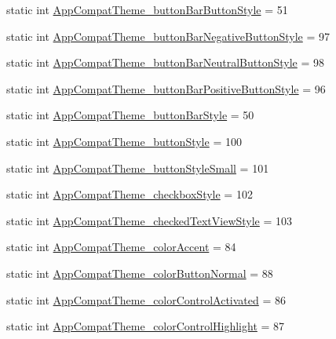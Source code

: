 \begin{DoxyCompactItemize}
\item 
static int \hyperlink{classandroid_1_1support_1_1v4_1_1R_1_1styleable_ad50ccb52e962750a3efe3c9332b26ffc}{App\+Compat\+Theme\+\_\+button\+Bar\+Button\+Style} = 51
\item 
static int \hyperlink{classandroid_1_1support_1_1v4_1_1R_1_1styleable_a82c991e2fa9810fd845a9728c7cea014}{App\+Compat\+Theme\+\_\+button\+Bar\+Negative\+Button\+Style} = 97
\item 
static int \hyperlink{classandroid_1_1support_1_1v4_1_1R_1_1styleable_aa58b2ce8a1ce16e8e54a6c8b84a6d15c}{App\+Compat\+Theme\+\_\+button\+Bar\+Neutral\+Button\+Style} = 98
\item 
static int \hyperlink{classandroid_1_1support_1_1v4_1_1R_1_1styleable_a94cd4ce61573e443fe4e9bb2a2d8e7c7}{App\+Compat\+Theme\+\_\+button\+Bar\+Positive\+Button\+Style} = 96
\item 
static int \hyperlink{classandroid_1_1support_1_1v4_1_1R_1_1styleable_a833b29c75685e8a0ac239143d3e6fb6e}{App\+Compat\+Theme\+\_\+button\+Bar\+Style} = 50
\item 
static int \hyperlink{classandroid_1_1support_1_1v4_1_1R_1_1styleable_a0a6f685c4d17c8080102fccc12ae235a}{App\+Compat\+Theme\+\_\+button\+Style} = 100
\item 
static int \hyperlink{classandroid_1_1support_1_1v4_1_1R_1_1styleable_a94aeecf1f336663e0e81694de154135c}{App\+Compat\+Theme\+\_\+button\+Style\+Small} = 101
\item 
static int \hyperlink{classandroid_1_1support_1_1v4_1_1R_1_1styleable_aa590bb5373f4b9fd718702b7c9454c66}{App\+Compat\+Theme\+\_\+checkbox\+Style} = 102
\item 
static int \hyperlink{classandroid_1_1support_1_1v4_1_1R_1_1styleable_a62b92d2bf4651c1c6fe848d00c83ebe2}{App\+Compat\+Theme\+\_\+checked\+Text\+View\+Style} = 103
\item 
static int \hyperlink{classandroid_1_1support_1_1v4_1_1R_1_1styleable_a70404ad3a5e8a8979dec037058215d60}{App\+Compat\+Theme\+\_\+color\+Accent} = 84
\item 
static int \hyperlink{classandroid_1_1support_1_1v4_1_1R_1_1styleable_a348ced1d660bc34dcde74f87751119ba}{App\+Compat\+Theme\+\_\+color\+Button\+Normal} = 88
\item 
static int \hyperlink{classandroid_1_1support_1_1v4_1_1R_1_1styleable_a0b39cc5b040b1cd3704ee635afa68425}{App\+Compat\+Theme\+\_\+color\+Control\+Activated} = 86
\item 
static int \hyperlink{classandroid_1_1support_1_1v4_1_1R_1_1styleable_afc6290158c8ec3418e088f79325e48cd}{App\+Compat\+Theme\+\_\+color\+Control\+Highlight} = 87

\end{DoxyCompactItemize}
